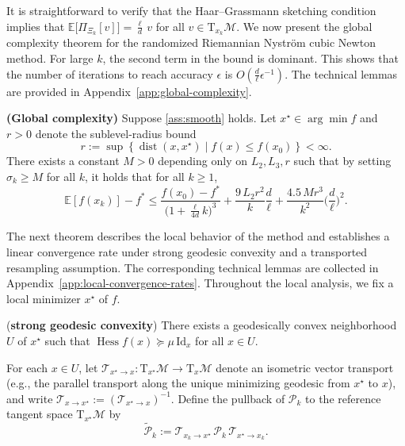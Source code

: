 \documentclass[final,onefignum,onetabnum]{siamart250211}
\newcommand{\Hess}{\operatorname{Hess}}
\begin{document}
It is straightforward to verify that the Haar--Grassmann sketching condition implies that
$
\mathbb E\big[\Pi_{\Xi_k}[v]\big]=\frac{\ell}{d}\,v
$
for all $v\in \mathrm{T}_{x_k}\mathcal{M}$.
We now present the global complexity theorem for the randomized Riemannian Nystr\"om cubic Newton method.  For large $k$, the second term in the bound is dominant. This shows that the number of iterations to reach accuracy $\epsilon$ is $O(\frac{d}{\ell}\epsilon^{-1})$. The technical lemmas are provided in Appendix~\ref{app:global-complexity}. 
\begin{theorem}\label{thm:global-complexity}
  \textbf{(Global complexity)}
Suppose \cref{ass:smooth} holds.
Let $x^\star\in\arg\min f$ and $r>0$ denote the sublevel-radius bound
\[
r:=\sup\left\{\operatorname{dist}(x,x^\star)\mid f(x)\le f(x_0) \right\}<\infty.
\]
There exists a constant $M>0$ depending only on $L_2, L_3, r$ such that by setting $\sigma_k \geq M$ for all $k$, it holds that for all $k\ge 1$,
\[
\mathbb{E}\left[f(x_k)\right]-f^*\le \frac{f(x_0)-f^*}{\big(1+\tfrac{\ell}{4d}k\big)^{3}}+\frac{9\,L_2 r^{2}}{k}\frac{d}{\ell}+\frac{4.5\,M r^{3}}{k^{2}}\Big(\frac{d}{\ell}\Big)^{2}.
\]
\end{theorem}




  
The next theorem describes the local behavior of the method and establishes a linear convergence rate under strong geodesic convexity and a transported resampling assumption. The corresponding technical lemmas are collected in Appendix~\ref{app:local-convergence-rates}. Throughout the local analysis, we fix a local minimizer $x^\star$ of $f$.
\begin{assumption}
  (\textbf{strong geodesic convexity})
  \label{ass:strong-geo-convexity}
There exists a geodesically convex neighborhood $U$ of $x^\star$ such that $\Hess f(x)\succeq \mu \,\mathrm{Id}_x$ for all $x\in U$.
\end{assumption}

For each $x\in U$, let
  $
  \mathcal T_{x^\star\to x}:\mathrm{T}_{x^\star}\mathcal{M}\to \mathrm{T}_x\mathcal{M}
  $
  denote an isometric vector transport (e.g., the parallel transport along the unique minimizing geodesic from $x^\star$ to $x$), and write $\mathcal T_{x\to x^\star}:=(\mathcal T_{x^\star\to x})^{-1}$.
  Define the pullback of $\mathcal{P}_k$ to the reference tangent space $\mathrm{T}_{x^\star}\mathcal{M}$ by
  \[
  \widetilde{\mathcal P}_k
  :=
  \mathcal T_{x_k\to x^\star}\,\mathcal P_k\,\mathcal T_{x^\star\to x_k}.
  \]
\end{document}
